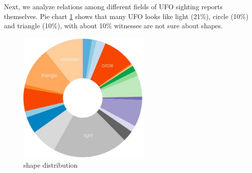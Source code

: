 Next, we analyze relations among different fields of UFO sighting reports themselves. Pie chart \ref{shape} shows that many UFO looks like light (21\%), circle (10\%) and triangle (10\%), with about 10\% witnesses are not sure about shapes. 

\begin{figure}[H]
    \centering
    \includegraphics[width=6.5cm]{figure/shape.jpg}
    \caption{shape distribution}
    \label{shape}
\end{figure}

